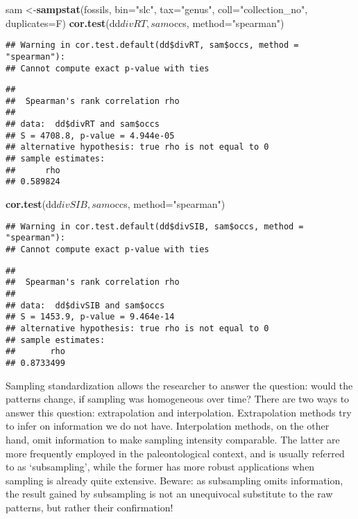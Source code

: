 \documentclass[]{article}
\newenvironment{Shaded}{\begin{snugshade}}{\end{snugshade}}
\newcommand{\KeywordTok}[1]{\textcolor[rgb]{0.13,0.29,0.53}{\textbf{{#1}}}}
\newcommand{\DataTypeTok}[1]{\textcolor[rgb]{0.13,0.29,0.53}{{#1}}}
\newcommand{\StringTok}[1]{\textcolor[rgb]{0.31,0.60,0.02}{{#1}}}
\newcommand{\NormalTok}[1]{{#1}}
\begin{document}
\begin{Shaded}
\begin{Highlighting}[]
\NormalTok{sam <-}\KeywordTok{sampstat}\NormalTok{(fossils, }\DataTypeTok{bin=}\StringTok{"slc"}\NormalTok{, }\DataTypeTok{tax=}\StringTok{"genus"}\NormalTok{, }\DataTypeTok{coll=}\StringTok{"collection_no"}\NormalTok{, }\DataTypeTok{duplicates=}\NormalTok{F)}
\KeywordTok{cor.test}\NormalTok{(dd$divRT, sam$occs, }\DataTypeTok{method=}\StringTok{"spearman"}\NormalTok{)}
\end{Highlighting}
\end{Shaded}

\begin{verbatim}
## Warning in cor.test.default(dd$divRT, sam$occs, method = "spearman"):
## Cannot compute exact p-value with ties
\end{verbatim}

\begin{verbatim}
## 
##  Spearman's rank correlation rho
## 
## data:  dd$divRT and sam$occs
## S = 4708.8, p-value = 4.944e-05
## alternative hypothesis: true rho is not equal to 0
## sample estimates:
##      rho 
## 0.589824
\end{verbatim}

\begin{Shaded}
\begin{Highlighting}[]
\KeywordTok{cor.test}\NormalTok{(dd$divSIB, sam$occs, }\DataTypeTok{method=}\StringTok{"spearman"}\NormalTok{)}
\end{Highlighting}
\end{Shaded}

\begin{verbatim}
## Warning in cor.test.default(dd$divSIB, sam$occs, method = "spearman"):
## Cannot compute exact p-value with ties
\end{verbatim}

\begin{verbatim}
## 
##  Spearman's rank correlation rho
## 
## data:  dd$divSIB and sam$occs
## S = 1453.9, p-value = 9.464e-14
## alternative hypothesis: true rho is not equal to 0
## sample estimates:
##       rho 
## 0.8733499
\end{verbatim}

Sampling standardization allows the researcher to answer the question:
would the patterns change, if sampling was homogeneous over time? There
are two ways to answer this question: extrapolation and interpolation.
Extrapolation methods try to infer on information we do not have.
Interpolation methods, on the other hand, omit information to make
sampling intensity comparable. The latter are more frequently employed
in the paleontological context, and is usually referred to as
`subsampling', while the former has more robust applications when
sampling is already quite extensive. Beware: as subsampling omits
information, the result gained by subsampling is not an unequivocal
substitute to the raw patterns, but rather their confirmation!
\end{document}
